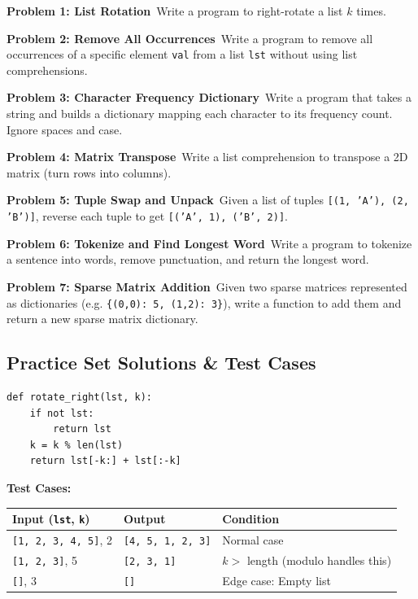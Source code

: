 \begin{practiceset}

\textbf{Problem 1: List Rotation}\
Write a program to right-rotate a list $k$ times.

\textbf{Problem 2: Remove All Occurrences}\
Write a program to remove all occurrences of a specific element \texttt{val} from a list \texttt{lst} without using list comprehensions.

\textbf{Problem 3: Character Frequency Dictionary}\
Write a program that takes a string and builds a dictionary mapping each character to its frequency count. Ignore spaces and case.

\textbf{Problem 4: Matrix Transpose}\
Write a list comprehension to transpose a 2D matrix (turn rows into columns).

\textbf{Problem 5: Tuple Swap and Unpack}\
Given a list of tuples \texttt{[(1, 'A'), (2, 'B')]}, reverse each tuple to get \texttt{[('A', 1), ('B', 2)]}.

\textbf{Problem 6: Tokenize and Find Longest Word}\
Write a program to tokenize a sentence into words, remove punctuation, and return the longest word.

\textbf{Problem 7: Sparse Matrix Addition}\
Given two sparse matrices represented as dictionaries (e.g. \texttt{\{(0,0): 5, (1,2): 3\}}), write a function to add them and return a new sparse matrix dictionary.
\end{practiceset}

\subsection{Practice Set Solutions \& Test Cases}

\begin{solutionbox}[Solution 1: List Rotation]
\begin{lstlisting}[language=Python3]
def rotate_right(lst, k):
    if not lst:
        return lst
    k = k % len(lst)
    return lst[-k:] + lst[:-k]
\end{lstlisting}
\textbf{Test Cases:}
\begin{table}[H]
    \centering\sffamily
    \begin{tabular}{llp{5cm}}
    \toprule
    \textbf{Input (\texttt{lst}, \texttt{k})} & \textbf{Output} & \textbf{Condition} \\
    \midrule
    \texttt{[1, 2, 3, 4, 5]}, 2 & \texttt{[4, 5, 1, 2, 3]} & Normal case \\
    \texttt{[1, 2, 3]}, 5 & \texttt{[2, 3, 1]} & $k >$ length (modulo handles this) \\
    \texttt{[]}, 3 & \texttt{[]} & Edge case: Empty list \\
    \bottomrule
    \end{tabular}
\end{table}
\end{solutionbox}

